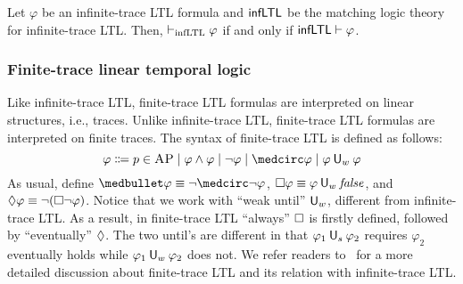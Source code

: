 \documentclass{amsart}
\begin{document}
\begin{theorem}
Let $\varphi$ be an infinite-trace LTL formula and $\mathsf{infLTL}$ be the matching
logic theory for infinite-trace LTL.
Then,
$\vdash_{\mathrm{infLTL}} \varphi$ if and only if
$\mathsf{infLTL} \vdash \varphi$.
\label{thm_csrvext_infLTL}
\end{theorem}

\subsubsection{Finite-trace linear temporal logic}
Like infinite-trace LTL,
finite-trace LTL formulas are interpreted on linear structures, i.e., traces.
Unlike infinite-trace LTL, finite-trace LTL formulas
are interpreted on finite traces.
The syntax of finite-trace LTL is defined as follows:
$$
\varphi \Coloneqq
p \in \AP \mid
\varphi \wedge \varphi \mid
\neg \varphi \mid
\wnext \varphi \mid
\varphi \Uw \varphi
$$
As usual,
define $\snext \varphi \equiv \neg \wnext \neg \varphi$,
${\square} \varphi \equiv \varphi \mathbin{\mathsf{U}_w} \mathit{false}$, and
${\lozenge} \varphi \equiv \neg ({\square} \neg \varphi)$.
Notice that we work with ``weak until'' $\mathbin{\mathsf{U}_w}$, different from infinite-trace LTL.
As a result, in finite-trace LTL ``always'' ${\square}$ is firstly defined,
followed by ``eventually'' ${\lozenge}$.
The two until's are different in that
$\varphi_1 \mathbin{\mathsf{U}_s} \varphi_2$ requires $\varphi_2$ eventually holds while
$\varphi_1 \mathbin{\mathsf{U}_w} \varphi_2$ does not.
We refer readers to~\cite{bibid} for a more detailed discussion about
finite-trace LTL and its relation with infinite-trace LTL.
\end{document}
